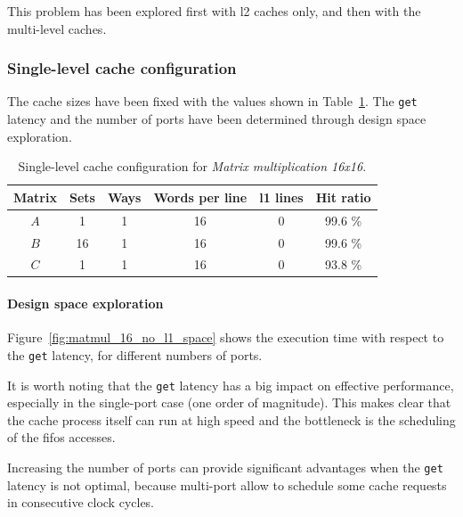 \documentclass[11pt,a4paper,oneside]{memoir}
\begin{document}
This problem has been explored first with \ac{l2} caches only, and then with the
multi-level caches.

\subsubsection{Single-level cache configuration}
The cache sizes have been fixed with the values shown in
Table~\ref{tab:matmul_16_no_l1_config}. The \texttt{get} latency and the number
of ports have been determined through design space exploration.

\begin{table}[H]
	\begin{center}
		\begin{tabular}{cccccc}
			\hline
			\rowcolor{gray!50}
			\textbf{Matrix} &
			\textbf{Sets} & \textbf{Ways} & \textbf{Words per line} &
			\textbf{\ac{l1} lines} & \textbf{Hit ratio} \\
			\hline
			$A$ & 1 & 1 & 16 & 0 & 99.6 \% \\
			\rowcolor{gray!25}
			$B$ & 16 & 1 & 16 & 0 & 99.6 \% \\
			$C$ & 1 & 1 & 16 & 0 & 93.8 \% \\
			\hline
		\end{tabular}
	\end{center}
	\caption{Single-level cache configuration for \emph{Matrix
	multiplication 16x16}.}
	\label{tab:matmul_16_no_l1_config}
\end{table}

\paragraph{Design space exploration}
Figure~\ref{fig:matmul_16_no_l1_space} shows the execution time with respect to
the \texttt{get} latency, for different numbers of ports.

It is worth noting that the \texttt{get} latency has a big impact on effective
performance, especially in the single-port case (one order of magnitude).
This makes clear that the cache process itself can run at high speed and the
bottleneck is the scheduling of the \acp{fifo} accesses.

Increasing the number of ports can provide significant advantages when the
\texttt{get} latency is not optimal, because multi-port allow to schedule some
cache requests in consecutive clock cycles.
\end{document}
